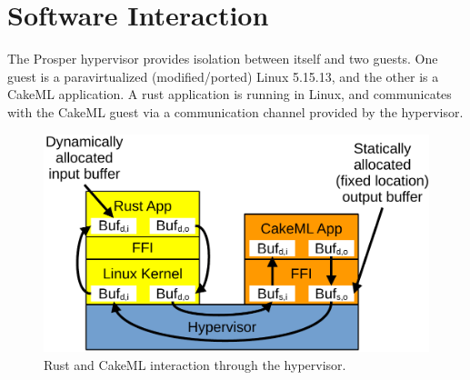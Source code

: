 \documentclass[11pt, a4paper]{article}
\begin{document}
\section*{Software Interaction}
The Prosper hypervisor provides isolation between itself and two guests. One
guest is a paravirtualized (modified/ported) Linux 5.15.13, and the other is a
CakeML application. A rust application is running in Linux, and communicates
with the CakeML guest via a communication channel provided by the hypervisor.

\begin{figure}
\center
\includegraphics[scale=0.7]{overview}
\caption{Rust and CakeML interaction through the hypervisor.}
\label{fig:overview}
\end{figure}
\end{document}

